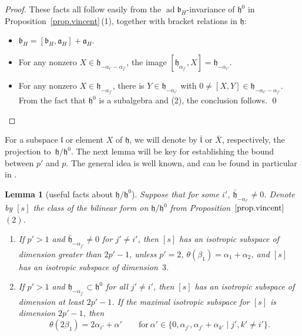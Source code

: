 \documentclass[10pt,a4paper]{amsart}
\numberwithin{equation}{section}
\newtheorem{lem}[thm]{Lemma}
\theoremstyle{definition}
\newcommand{\lieh}{\mathfrak{h}}
\def\a{{\mathfrak a}}
\def\b{{\mathfrak b}}
\newcommand{\ad}{\operatorname{ad}}
\begin{document}
\begin{proof}
These facts all follow easily from the $\ad \b_H$-invariance of $\lieh^0$ in Proposition~\ref{prop.vincent}\,(1), together with bracket relations in $\lieh$:
\begin{itemize}\itemsep=0pt
\item[(1)] $\b_H = [\b_H, \a_H] + \a_H$.
\item[(2)] For any nonzero $X \in \lieh_{- \alpha_{i'} - \alpha_{j'}}$, the image $[\lieh_{\alpha_{j'}},X] = \lieh_{-\alpha_{i'}}$.
\item[(3)] For any nonzero $X \in \lieh_{-\alpha_{j'}}$, there is $Y \in \lieh_{- \alpha_{i'}}$ with $0 \neq [X,Y] \in \lieh_{- \alpha_{i'}-\alpha_{j'}}$. From the fact that $\lieh^0$ is a subalgebra and (2), the conclusion follows.
\hfill\qed
\end{itemize}
\renewcommand{\qed}{}
\end{proof}

For a subspace $\mathfrak{l}$ or element $X$ of $\lieh$, we will denote by $\bar{\mathfrak{l}}$ or $\bar{X}$, respectively, the projection to~$\lieh/\lieh^0$.
The next lemma will be key for establishing the bound between $p'$ and $p$. The general idea is well known, and can be found in particular in \cite{pecastaing.rank1}.



\begin{lem}[useful facts about $\lieh/\lieh^0$]
\label{lem.h.mod.h0}
Suppose that for some $i'$, $\bar{\lieh}_{- \alpha_{i'}} \neq 0$. Denote by $[s]$ the class of the bilinear form on $\lieh/\lieh^0$ from Proposition~$\ref{prop.vincent}$\,$(2)$.
\begin{enumerate}\itemsep=0pt
\item[$(1)$] If $p' >1$ and $\bar{\lieh}_{- \alpha_{j'}} \neq 0$ for $j' \neq i'$, then $[s]$ has an isotropic subspace of dimension greater than $2p' - 1$, unless $p'=2$, $\theta(\beta_1) = \alpha_1 + \alpha_2$, and $[s]$ has an isotropic subspace of dimension~$3$.
\item[$(2)$] If $p' > 1$ and $\lieh_{- \alpha_{j'}} \subset \lieh^0$ for all $j' \neq i'$, then $[s]$ has an isotropic subspace of dimension at least $2p'-1$. If the maximal isotropic subspace for $[s]$ is dimension $2 p' - 1$, then
 \[\theta(2 \beta_1) = 2 \alpha_{i'} + \alpha'\qquad \mbox{for} \ \alpha' \in \{ 0, \alpha_{j'}, \alpha_{j'} + \alpha_{k'} \mid j', k' \neq i' \}.\]
\end{enumerate}
\end{lem}
\end{document}

